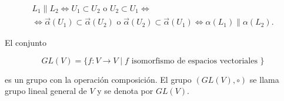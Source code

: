 \documentclass[12pt, a4paper, ones, notitlepage, openany,titlepage]{article}
\begin{document}
\begin{enumerate}
\begin{enumerate}
		\begin{gather*}
			L_{1} \| L_{2} \Longleftrightarrow U_{1} \subset U_{2} \text { o } U_{2} \subset U_{1} \Longleftrightarrow \\
			\Longleftrightarrow \vec{\alpha}\left(U_{1}\right) \subset \vec{\alpha}\left(U_{2}\right) \text { o } \vec{\alpha}\left(U_{2}\right) \subset \vec{\alpha}\left(U_{1}\right) \Longleftrightarrow \alpha\left(L_{1}\right) \| \alpha\left(L_{2}\right) .
		\end{gather*}
		
		El conjunto
		
		$$
		G L(V)=\{f: V \rightarrow V \mid f \text { isomorfismo de espacios vectoriales }\}
		$$
		
		es un grupo con la operación composición. El grupo $(G L(V), \circ)$ se llama grupo lineal general de $V$ y se denota por $G L(V)$.
		
	\end{enumerate}
\end{enumerate}
\end{document}
